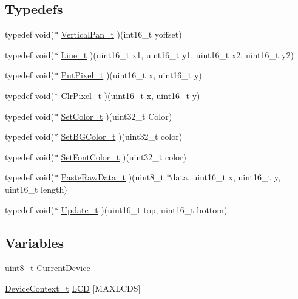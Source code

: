 \subsection*{Typedefs}
\begin{CompactItemize}
\item 
typedef void($\ast$ \hyperlink{group__graphic__hw__interface_g18b37a90b4b77654c4a5f7613868d4aa}{VerticalPan\_\-t} )(int16\_\-t yoffset)
\item 
typedef void($\ast$ \hyperlink{group__graphic__hw__interface_g91ecaa7e16f781d972a8f96c4cd59492}{Line\_\-t} )(uint16\_\-t x1, uint16\_\-t y1, uint16\_\-t x2, uint16\_\-t y2)
\item 
typedef void($\ast$ \hyperlink{group__graphic__hw__interface_gd4fdf6d87a3b08492ea381f7bbc3922f}{PutPixel\_\-t} )(uint16\_\-t x, uint16\_\-t y)
\item 
typedef void($\ast$ \hyperlink{group__graphic__hw__interface_g6840b9250f097bd4e0cc14ab0b607101}{ClrPixel\_\-t} )(uint16\_\-t x, uint16\_\-t y)
\item 
typedef void($\ast$ \hyperlink{group__graphic__hw__interface_ge9372db6223f46e25c072f5d97b4223f}{SetColor\_\-t} )(uint32\_\-t Color)
\item 
typedef void($\ast$ \hyperlink{group__graphic__hw__interface_g7373056a36a75da73dc4921dd10074fa}{SetBGColor\_\-t} )(uint32\_\-t color)
\item 
typedef void($\ast$ \hyperlink{group__graphic__hw__interface_g2720234f07ba67eb55362ad2b1b3d102}{SetFontColor\_\-t} )(uint32\_\-t color)
\item 
typedef void($\ast$ \hyperlink{group__graphic__hw__interface_g23f1f3d777d2fee79309669dcd30cdac}{PasteRawData\_\-t} )(uint8\_\-t $\ast$data, uint16\_\-t x, uint16\_\-t y, uint16\_\-t length)
\item 
typedef void($\ast$ \hyperlink{group__graphic__hw__interface_gd6ccf1837a820c03c88a134373cba158}{Update\_\-t} )(uint16\_\-t top, uint16\_\-t bottom)
\end{CompactItemize}
\subsection*{Variables}
\begin{CompactItemize}
\item 
uint8\_\-t \hyperlink{group__graphic__hw__interface_g90833154adae4dc76085e743d7575b52}{CurrentDevice}
\item 
\hyperlink{struct_device_context__t}{DeviceContext\_\-t} \hyperlink{group__graphic__hw__interface_g1a43e4812f9eef5a406226252379dc04}{LCD} \mbox{[}MAXLCDS\mbox{]}
\end{CompactItemize}



